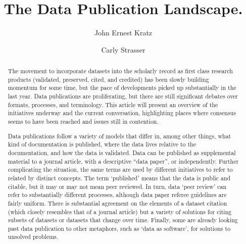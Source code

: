 \documentclass[10pt,twocolumn]{article}
\begin{document}
\title{The Data Publication Landscape.}
\author[1]{John Ernest Kratz}
\author[1]{Carly Strasser}

\maketitle
\thispagestyle{fancy}


\begin{abstract}


The movement to incorporate datasets into the scholarly record as first class\cite{sarah_callaghan_making_2012} research products (validated, preserved, cited, and credited) has been slowly building momentum for some time, but the pace of developments picked up substantially in the last year.
Data publications are proliferating, but there are still significant debates over formats, processes, and terminology.
This article will present an overview of the initiatives underway and the current conversation, highlighting places where consensus seems to have been reached and issues still in contention.

Data publications follow a variety of models that differ in, among other things, what kind of documentation is published, where the data lives relative to the documentation, and how the data is validated.
Data can be published as supplemental material to a journal article, with a descriptive ``data paper'', or independently.
Further complicating the situation, the same terms are used by different initiatives to refer to related by distinct concepts.
The term `published' means that the data is public and citable, but it may or may not mean peer reviewed.
In turn, data `peer review' can refer to substantially different processes, although data paper referee guidelines are fairly uniform.
There is substantial agreement on the elements of a dataset citation (which closely resembles that of a journal article) but a variety of solutions for citing subsets of datasets or datasets that change over time.
Finally, some are already looking past data publication to other metaphors, such as `data as software', for solutions to unsolved problems.

\end{abstract}
\clearpage
\end{document}
